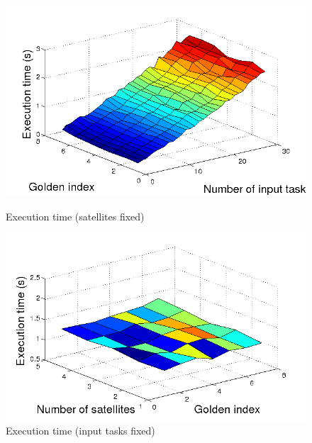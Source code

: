 \begin{figure}[ht]
  \begin{minipage}[b]{0.5\linewidth}
    \includegraphics[width=\linewidth]{Figures/tLG_satsfix.png}
    \caption{Execution time (satellites fixed)}\label{fig_tLG_satsfix}
  \end{minipage}  
  \begin{minipage}[b]{0.5\linewidth}
    \includegraphics[width=\linewidth]{Figures/tLG_tasksfix.png}
    \caption{Execution time (input tasks fixed)}\label{fig_tLG_tasksfix}
  \end{minipage}  


\end{figure}
